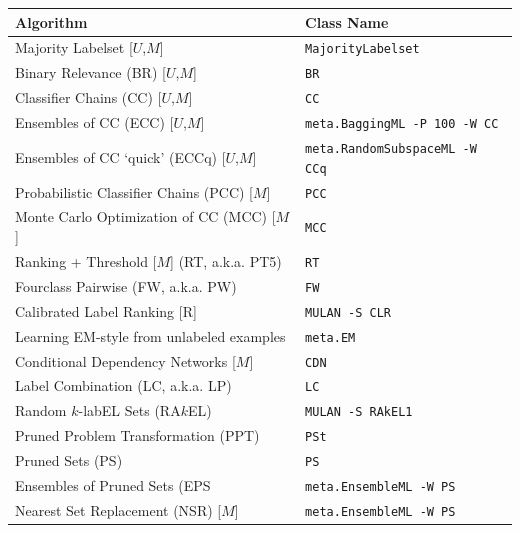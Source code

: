 \documentclass[11pt]{article}
\begin{document}
{
{\par \vspace{2mm}}
\begin{tabular}{ll}
	\hline
	\textbf{Algorithm}               & \textbf{Class Name} \\
	\hline
	Majority Labelset [$U$,$M$] & \texttt{MajorityLabelset} \\
	\hline
	Binary Relevance (BR) [$U$,$M$] & \texttt{BR} \\
	Classifier Chains (CC) [$U$,$M$] & \texttt{CC} \\
	Ensembles of CC (ECC)  [$U$,$M$] & \texttt{meta.BaggingML -P 100 -W CC} \\
	Ensembles of CC `quick' (ECCq) [$U$,$M$] & \texttt{meta.RandomSubspaceML -W CCq} \\
	Probabilistic Classifier Chains (PCC) [$M$] & \texttt{PCC} \\
	Monte Carlo Optimization of CC (MCC) [$M$] & \texttt{MCC} \\
	\hline
	Ranking + Threshold [$M$] (RT, a.k.a. PT5)  & \texttt{RT} \\
	\hline
	Fourclass Pairwise (FW, a.k.a. PW)  & \texttt{FW} \\
	Calibrated Label Ranking [R] & \texttt{MULAN -S CLR} \\ 
	\hline
	Learning EM-style from unlabeled examples  & \texttt{meta.EM} \\ 
	\hline
	Conditional Dependency Networks [$M$] & \texttt{CDN} \\ 
	\hline
	Label Combination (LC, a.k.a. LP) & \texttt{LC} \\ 
	Random $k$-labEL Sets (RA$k$EL) & \texttt{MULAN -S RAkEL1} \\ 
	Pruned Problem Transformation (PPT)  & \texttt{PSt} \\
	Pruned Sets (PS)               & \texttt{PS} \\
	Ensembles of Pruned Sets (EPS  & \texttt{meta.EnsembleML -W PS} \\
	Nearest Set Replacement (NSR) [$M$]  & \texttt{meta.EnsembleML -W PS} \\
	\hline
\end{tabular}
}


\end{document}
